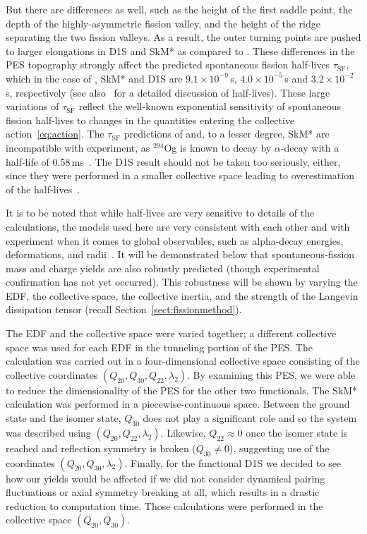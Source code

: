 But there are differences as well, such as the height of the first saddle point, the depth of the highly-asymmetric fission valley, and the height of the ridge separating the two fission valleys. As a result, the outer turning points are pushed to larger elongations in D1S and SkM* as compared to \hfb{}. These differences in the PES topography strongly affect the predicted spontaneous fission half-lives $\tau_\mathrm{SF}$, which in the case of \hfb{}, SkM* and D1S are $9.1\times10^{-9}\,$s, $4.0\times10^{-5}\,$s and $3.2\times10^{-2}\,$s, respectively (see also~\cite{Staszczak2013,Baran2015} for a detailed discussion of half-lives). These large variations of $\tau_\mathrm{SF}$ reflect the well-known exponential sensitivity of spontaneous fission half-lives to changes in the quantities entering the collective action~\eqref{eq:action}. The $\tau_\mathrm{SF}$ predictions of \hfb{} and, to a lesser degree,  SkM* are incompatible with experiment, as $^{294}$Og  is known to  decay by $\alpha$-decay with a half-life of 0.58\,ms~\cite{Brewer2018}. The D1S result should not be taken too seriously, either, since they were performed in a smaller collective space leading to overestimation of the half-lives~\cite{Giuliani2014,Sadhukhan2014}.

It is to be noted that while half-lives are very sensitive to details of the calculations, the models used here are very consistent with each other and with experiment when it comes to global observables, such as alpha-decay energies, deformations, and radii~\cite{Heenen2015,Giuliani2019}. It will be demonstrated below that spontaneous-fission mass and charge yields are also robustly predicted (though experimental confirmation has not yet occurred). This robustness will be shown by varying the EDF, the collective space, the collective inertia, and the strength of the Langevin dissipation tensor (recall Section~\ref{sect:fissionmethod}).

The EDF and the collective space were varied together; a different collective space was used for each EDF in the tunneling portion of the PES. The {\hfb} calculation was carried out in a four-dimensional collective space consisting of the collective coordinates $(Q_{20}, Q_{30}, Q_{22}, \lambda_2)$. By examining this PES, we were able to reduce the dimensionality of the PES for the other two functionals. The SkM* calculation was performed in a piecewise-continuous space. Between the ground state and the isomer state, $Q_{30}$ does not play a significant role and so the system was described using  $(Q_{20}, Q_{22}, \lambda_2)$. Likewise, $Q_{22} \approx 0$ once the isomer state is reached and reflection symmetry is broken ($Q_{30} \neq 0$), suggesting use of the coordinates  $(Q_{20}, Q_{30}, \lambda_2)$. Finally, for the functional D1S we decided to see how our yields would be affected if we did not consider dynamical pairing fluctuations or axial symmetry breaking at all, which results in a drastic reduction to computation time. Those calculations were performed in the collective space $(Q_{20}, Q_{30})$.


